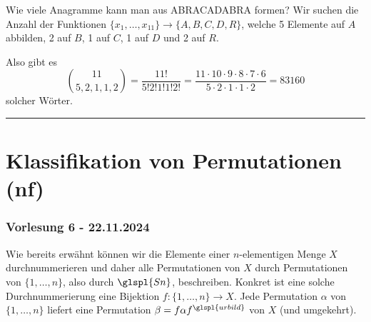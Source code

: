 \documentclass[9pt]{article}
\begin{document}
\begin{bsp}
Wie viele Anagramme kann man aus ABRACADABRA formen? Wir suchen die Anzahl der Funktionen \( \{x_1, \ldots, x_{11}\} \rightarrow \{A, B, C, D, R\} \), welche 5 Elemente auf \( A \) abbilden, 2 auf \( B \), 1 auf \( C \), 1 auf \( D \) und 2 auf \( R \). 

Also gibt es
\[
\binom{11}{5, 2, 1, 1, 2} = \frac{11!}{5!2!1!1!2!} = \frac{11 \cdot 10 \cdot 9 \cdot 8 \cdot 7 \cdot 6}{5 \cdot 2 \cdot 1 \cdot 1 \cdot 2} = 83160
\]
solcher Wörter.
\end{bsp} \noindent \rule{8cm}{0.4pt}

\section{Klassifikation von Permutationen (nf)}
\subsubsection*{Vorlesung 6 - 22.11.2024}
Wie bereits erwähnt können wir die Elemente einer $n$-elementigen Menge $X$ durchnummerieren und daher alle Permutationen von $X$ durch Permutationen von $\{1, \dots, n\}$, also durch $\glspl{Sn}$, beschreiben. Konkret ist eine solche Durchnummerierung eine Bijektion $f: \{1, \dots, n\} \to X$. Jede Permutation $\alpha$ von $\{1, \dots, n\}$ liefert eine Permutation $\beta = f \alpha f^{\glspl{urbild}}$ von $X$ (und umgekehrt). \\
\end{document}

